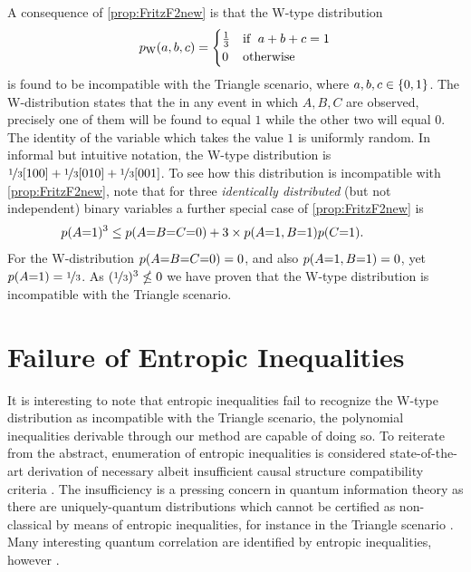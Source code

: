 A consequence of \cref{prop:FritzF2new} is that the W-type distribution
\begin{align}\label{eq:wdistributionnew}
p_{\text{W}}\lparen a,b,c\rparen=\begin{cases}\tfrac{1}{3}&\text{if }\; a+b+c=1 \\ 0&\text{otherwise}\end{cases}
\end{align}
is found to be incompatible with the Triangle scenario, where $a,b,c\in\left\lbrace0,1\right\rbrace$. The W-distribution states that the in any event in which $A,B,C$ are observed, precisely one of them will be found to equal $1$ while the other two will equal $0$. The identity of the variable which takes the value $1$ is uniformly random. In informal but intuitive notation, the W-type distribution is ${\nicefrac{1}{3}[100]+\nicefrac{1}{3}[010]+\nicefrac{1}{3}[001]}$.
To see how this distribution is incompatible with \cref{prop:FritzF2new}, note that for three \emph{identically distributed} (but not independent) binary variables a further special case of \cref{prop:FritzF2new} is
\begin{align*}\begin{split}
&\hspace{-6ex}\p{A\cramp{=}1}^3\leq \p{A\cramp{=}B\cramp{=}C\cramp{=}0} + 3\times\p{A\cramp{=}1,B\cramp{=}1}\p{C\cramp{=}1}.
\end{split}\end{align*}
For the W-distribution ${p\lparen A\mathord{=}B\mathord{=}C\mathord{=}0\rparen=0}$, and also ${p\lparen A\mathord{=}1,B\mathord{=}1\rparen=0}$, yet ${p\lparen A\mathord{=}1\rparen=\nicefrac{1}{3}}$. As ${(\nicefrac{1}{3})^3\nleq 0}$ we have proven that the W-type distribution is incompatible with the Triangle scenario.



\section{Failure of Entropic Inequalities }

It is interesting to note that entropic inequalities \cite{fritz2013marginal,chaves2014novel,chaves2014informationinference} fail to recognize the W-type distribution as incompatible with the Triangle scenario, the polynomial inequalities derivable through our method are capable of doing so. To reiterate from the abstract, enumeration of entropic inequalities is considered state-of-the-art derivation of necessary albeit insufficient causal structure compatibility criteria \cite{pusey2014gdag}. The insufficiency is a pressing concern in quantum information theory as there are uniquely-quantum distributions which cannot be certified as non-classical by means of entropic inequalities, for instance in the Triangle scenario \citep[Prob. 2.17]{fritz2012bell}. Many interesting quantum correlation are identified by entropic inequalities, however \cite{SchumacherInequality,chaves2012entropic}. 

